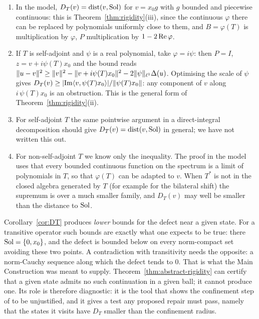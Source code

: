 \begin{remark}\label{rem:DT}
\begin{enumerate}[label=(\alph*)]
\item In the model, $D_T(v)=\operatorname{dist}(v,\operatorname{Sol})$ for $v=x_0g$ with $g$ bounded and piecewise
continuous: this is Theorem~\ref{thm:rigidity}(iii), since the continuous $\varphi$ there can
be replaced by polynomials uniformly close to them, and $B=\varphi(T)$ is multiplication by
$\varphi$, $P$ multiplication by $1-2\operatorname{Re}\varphi$.
\item If $T$ is self-adjoint and $\psi$ is a real polynomial, take $\varphi=i\psi$: then $P=I$,
$z=v+i\psi(T)x_0$ and the bound reads
$\lVert u-v\rVert^2\ge\lVert v\rVert^2-\lVert v+i\psi(T)x_0\rVert^2-2\lVert \psi\rVert_{\ell^1}\Delta(u)$. Optimising the
scale of $\psi$ gives $D_T(v)\ge\lvert \operatorname{Im}\langle v,\psi(T)x_0\rangle\rvert/\lVert \psi(T)x_0\rVert$:
any component of $v$ along $i\,\psi(T)x_0$ is an obstruction. This is the general form of
Theorem~\ref{thm:rigidity}(ii).
\item For self-adjoint $T$ the same pointwise argument in a direct-integral decomposition
should give $D_T(v)=\operatorname{dist}(v,\operatorname{Sol})$ in general; we have not written this out.
\item For non-self-adjoint $T$ we know only the inequality. The proof in the model uses that
every bounded continuous function on the spectrum is a limit of polynomials in $T$, so that
$\varphi(T)$ can be adapted to $v$. When $T^*$ is not in the closed algebra generated by $T$
(for example for the bilateral shift) the supremum is over a much smaller family, and
$D_T(v)$ may well be smaller than the distance to $\operatorname{Sol}$.
\end{enumerate}
\end{remark}

\begin{remark}\label{rem:noproof}
Corollary~\ref{cor:DT} produces \emph{lower} bounds for the defect near a given state. For a
transitive operator such bounds are exactly what one expects to be true: there
$\operatorname{Sol}=\{0,x_0\}$, and the defect is bounded below on every norm-compact set avoiding these two
points. A contradiction with transitivity needs the opposite: a norm-Cauchy sequence along which
the defect tends to $0$. That is what the Main Construction was meant to supply.
Theorem~\ref{thm:abstract-rigidity} can certify that a given state admits no such continuation
in a given ball; it cannot produce one. Its role is therefore diagnostic: it is the tool that
shows the confinement step of \paper{} to be unjustified, and it gives a test any proposed
repair must pass, namely that the states it visits have $D_T$ smaller than the confinement
radius.
\end{remark}


